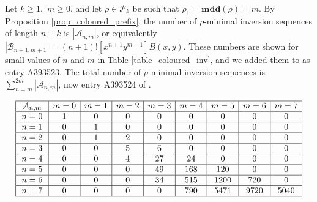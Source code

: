 \documentclass[a4paper,11pt]{article}
\theoremstyle{definition}
\theoremstyle{remark}
\renewcommand{\P}{\mathcal{P}}
\newcommand{\mdd}{\mathbf{mdd}}
\begin{document}
Let $k \geq 1$, $\,m \geq 0$, and let $\rho \in \P_k$ be such that $\rho_1 = \mdd(\rho) = m$. By Proposition \ref{prop_coloured_prefix}, the number of $\rho$-minimal inversion sequences of length $n+k$ is $|\mathcal A_{n,m}|$, or equivalently $|\mathcal B_{n+1,m+1}| = (n+1)! [x^{n+1} y^{m+1}] B(x,y)$. These numbers are shown for small values of $n$ and $m$ in Table \ref{table_coloured_inv}, and we added them to \cite{OEIS} as entry A393523. The total number of $\rho$-minimal inversion sequences is $\sum_{n = m}^{2m} |\mathcal A_{n,m}|$, now entry A393524 of \cite{OEIS}.

\begin{table}
$$\begin{array}{|c|c|c|c|c|c|c|c|c|}
\hline
|\mathcal A_{n,m}| & m=0 & m=1 & m=2 & m=3 & m=4 & m=5 & m = 6 & m = 7 \\
\hline
n=0 & 1 & 0 & 0 & 0 & 0 & 0 & 0 & 0 \\
\hline
n=1 & 0 & 1 & 0 & 0 & 0 & 0 & 0 & 0\\
\hline
n=2 & 0 & 1 & 2 & 0 & 0 & 0 & 0 & 0 \\
\hline
n=3 & 0 & 0 & 5 & 6 & 0 & 0 & 0 & 0 \\
\hline
n=4 & 0 & 0 & 4 & 27 & 24 & 0 & 0 & 0 \\
\hline
n=5 & 0 & 0 & 0 & 49 & 168 & 120 & 0 & 0 \\
\hline
n=6 & 0 & 0 & 0 & 34 & 515 & 1200 & 720 & 0 \\
\hline
n=7 & 0 & 0 & 0 & 0 & 790 & 5471 & 9720 & 5040 \\
\hline
\end{array}$$
\caption{The numbers $|\mathcal A_{n,m}|$ for $n,m \in [0,7]$.}
\label{table_coloured_inv}
\end{table}
\end{document}
